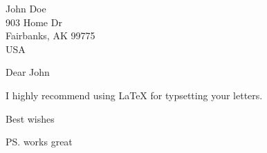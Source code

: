 \documentclass[english]{GIletter}
\begin{document}
\begin{letter}
  {John Doe \\
    903 Home Dr \\
    Fairbanks, AK 99775 \\
    USA  \\
  }
  
  \opening{Dear John}
  
  I highly recommend using \LaTeX{} for typsetting your letters. 

  \closing{Best wishes}
  
  
  \ps{works great}
  
\end{letter}
\end{document}
